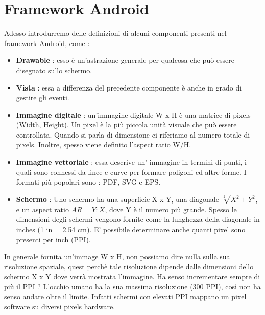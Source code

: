 \documentclass[12pt]{report}
\begin{document}
\chapter{Framework Android}
Adesso introdurremo delle definizioni di alcuni componenti presenti nel framework Android, come :
\begin{itemize}
\item \textbf{Drawable} : esso è un'astrazione generale per qualcosa che può essere disegnato sullo schermo.
\item \textbf{Vista} : essa a differenza del precedente componente è anche in grado di gestire gli eventi.
\item \textbf{Immagine digitale} : un'immagine digitale W x H è una matrice di pixels (Width, Height). Un pixel è la più piccola unità visuale che può essere controllata. Quando si parla di dimensione ci riferiamo al numero totale di pixels. Inoltre, spesso viene definito l'aspect ratio W/H.
\item \textbf{Immagine vettoriale} : essa descrive un' immagine in termini di punti, i quali sono connessi da linee e curve per formare poligoni ed altre forme. I formati più popolari sono : PDF, SVG e EPS.
\item \textbf{Schermo} : Uno schermo ha una superficie X x Y, una diagonale $\sqrt[2]{X^2 + Y^2}$, e un aspect ratio $AR = Y:X$, dove Y è il numero più grande. Spesso le dimensioni degli schermi vengono fornite come la lunghezza della diagonale in inches (1 in = 2.54 cm). E' possibile determinare anche quanti pixel sono presenti per inch (PPI).
\end{itemize}
In generale fornita un'immage W x H, non possiamo dire nulla sulla sua risoluzione spaziale, quest perchè tale risoluzione dipende dalle dimensioni dello schermo X x Y dove verrà mostrata l'immagine. Ha senso incrementare sempre di più il PPI ? L'occhio umano ha la sua massima risoluzione (300 PPI), così non ha senso andare oltre il limite. Infatti schermi con elevati PPI mappano un pixel software su diversi pixels hardware.
\end{document}
